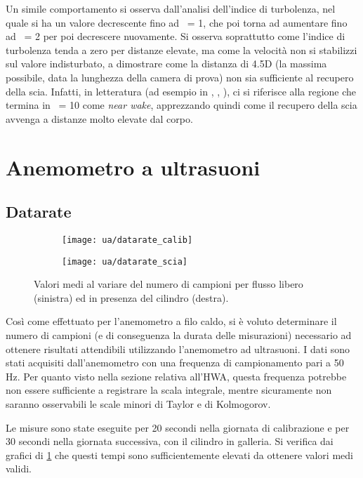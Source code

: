 \documentclass{article} %
\newcommand{\xd}{\nicefrac{\textrm{x}}{\textrm{D}}\ }
\begin{document}
\begin{minipage}[t]{0.5\textwidth}
	\centering
	\begin{minipage}[t]{0.95\textwidth} \onehalfspacing
		Un simile comportamento si osserva dall'analisi dell'indice di turbolenza, nel quale si ha un valore decrescente fino ad \xd = 1, che poi torna ad aumentare fino ad \xd = 2 per poi decrescere nuovamente. Si osserva soprattutto come l'indice di turbolenza tenda a zero per distanze elevate, ma come la velocità non si stabilizzi sul valore indisturbato, a dimostrare come la distanza di 4.5D (la massima possibile, data la lunghezza della camera di prova) non sia sufficiente al recupero della scia. Infatti, in letteratura (ad esempio in \cite{roshko61}, \cite{williamson96}, \cite{braza06}), ci si riferisce alla regione  che termina in \xd = 10 come \textit{near wake}, apprezzando quindi come il recupero della scia avvenga a distanze molto elevate dal corpo.
	\end{minipage}
\end{minipage}
\newpage
\section{Anemometro a ultrasuoni}
\subsection{Datarate}
\begin{figure}[h!]
    \begin{subfigure}{0.5\textwidth}
        \texttt{[image: ua/datarate\_calib]}
    \end{subfigure}
    \begin{subfigure}{0.5\textwidth}
        \texttt{[image: ua/datarate\_scia]}        
    \end{subfigure}    
    \caption{Valori medi al variare del numero di campioni per flusso libero (sinistra) ed in presenza del cilindro (destra).}
    \label{fig:datarate_ua}  
\end{figure}
Così come effettuato per l'anemometro a filo caldo, si è voluto determinare il numero di campioni (e di conseguenza la durata delle misurazioni) necessario ad ottenere risultati attendibili utilizzando l'anemometro ad ultrasuoni.
I dati sono stati acquisiti dall'anemometro con una frequenza di campionamento pari a 50 Hz. Per quanto visto nella sezione relativa all'HWA, questa frequenza potrebbe non essere sufficiente a registrare la scala integrale, mentre sicuramente non saranno osservabili le scale minori di Taylor e di Kolmogorov.\par
Le misure sono state eseguite per 20 secondi nella giornata di calibrazione e per 30 secondi nella giornata successiva, con il cilindro in galleria. Si verifica dai grafici di \cref{fig:datarate_ua} che questi tempi sono sufficientemente elevati da ottenere valori medi validi.
\end{document}
